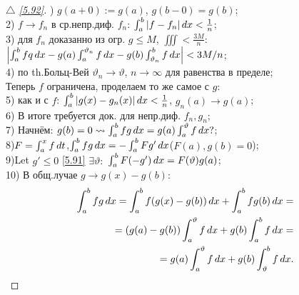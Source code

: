 \hfill
\begin{minipage}[t]{0.5\textwidth}
\begin{proof}[
 $\triangle$
\eqref{5.92}]

\phantom{42}
) $g(a+0):= g(a)$, $g(b-0) = g(b)$;\\
2) $f\to f_n$ в ср.непр.диф. $f_n$: $\int_a^b|f-f_n|\, d x < \frac{1}{n}$;\\
3) для $f_n$ доказанно из огр. $g\leq M$, $\iiint < \frac{3M}{n}:$\\ 
$\left| \int_a^b f q \, d x - g(a) \int_a^{\vartheta_n} f \, d x - g(b) \int_{\vartheta_n}^b f \, d x \right| < 3M/n$;\\
4) по th.Больц-Вей $\vartheta_n \to \vartheta$, $n\to \infty$ для равенства в пределе;\\
Теперь $f$ ограничена, проделаем то же самое с $g$:\\
5) как и с $f$: $\int_a^b |g(x) - g_n(x)| \, d x < \frac{1}{n}$, $g_n(a) \to g(a)$;\\
6) В итоге требуется док. для непр.диф. $f_n,g_n$;\\
7) Начнём: $g(b) = 0\leadsto \int_a^b f g \, d x = g(a) \int_a^{\vartheta} f \, d x?$;\\
8)$F = \int_a^x f \, d t$,$\int_a^b f g \, d x = -\int_a^b F g' \, d x$($F(a), g(b) = 0$);\\
9)Let $g' \leq 0$ \eqref{5.91} $\exists \vartheta:$ $\int_a^b F(-g') \, d x = F(\vartheta) g(a)$;\\
10) В общ.лучае $g \to g(x) - g(b):$
\begin{equation*}
	\begin{aligned}
		\int_a^b f g \, d x = \int_a^b f (g(x) - g(b)) \, d x + \int_a^b f g(b) \, d x =\\
		= (g(a)-g(b)) \int_a^{\vartheta} f \, d x + g(b) \int_a^b f \, d x = \\
		= g(a) \int_a^{\vartheta} f \, d x + g(b)  \int_{\vartheta}^b f \, d x.  
	\end{aligned}
\end{equation*}
\end{proof}
\end{minipage}